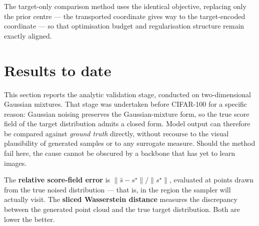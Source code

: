 \documentclass[11pt]{article}
\begin{document}
The target-only comparison method uses the identical objective, replacing only the prior centre ---
the transported coordinate gives way to the target-encoded coordinate --- so that optimisation
budget and regularisation structure remain exactly aligned.

\section{Results to date}
\label{sec:results}

This section reports the analytic validation stage, conducted on two-dimensional Gaussian mixtures.
That stage was undertaken before CIFAR-100 for a specific reason: Gaussian noising preserves the
Gaussian-mixture form, so the true score field of the target distribution admits a closed form.
Model output can therefore be compared against \emph{ground truth} directly, without recourse to the
visual plausibility of generated samples or to any surrogate measure. Should the method fail here,
the cause cannot be obscured by a backbone that has yet to learn images.

The \textbf{relative score-field error} is $\|\hat{s}-s^\star\|/\|s^\star\|$, evaluated at points
drawn from the true noised distribution --- that is, in the region the sampler will actually visit.
The \textbf{sliced Wasserstein distance} measures the discrepancy between the generated point cloud
and the true target distribution. Both are lower the better.
\end{document}
